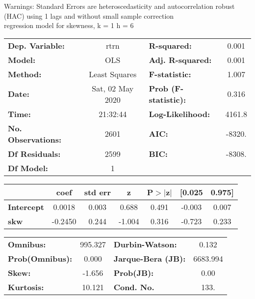 Warnings: \newline
 [1] Standard Errors are heteroscedasticity and autocorrelation robust (HAC) using 1 lags and without small sample correction\\ 

regression model for skewness, k = 1 h = 6\begin{center}
\begin{tabular}{lclc}
\toprule
\textbf{Dep. Variable:}    &       rtrn       & \textbf{  R-squared:         } &     0.001   \\
\textbf{Model:}            &       OLS        & \textbf{  Adj. R-squared:    } &     0.001   \\
\textbf{Method:}           &  Least Squares   & \textbf{  F-statistic:       } &     1.007   \\
\textbf{Date:}             & Sat, 02 May 2020 & \textbf{  Prob (F-statistic):} &    0.316    \\
\textbf{Time:}             &     21:32:44     & \textbf{  Log-Likelihood:    } &    4161.8   \\
\textbf{No. Observations:} &        2601      & \textbf{  AIC:               } &    -8320.   \\
\textbf{Df Residuals:}     &        2599      & \textbf{  BIC:               } &    -8308.   \\
\textbf{Df Model:}         &           1      & \textbf{                     } &             \\
\bottomrule
\end{tabular}
\begin{tabular}{lcccccc}
                   & \textbf{coef} & \textbf{std err} & \textbf{z} & \textbf{P$> |$z$|$} & \textbf{[0.025} & \textbf{0.975]}  \\
\midrule
\textbf{Intercept} &       0.0018  &        0.003     &     0.688  &         0.491        &       -0.003    &        0.007     \\
\textbf{skw}       &      -0.2450  &        0.244     &    -1.004  &         0.316        &       -0.723    &        0.233     \\
\bottomrule
\end{tabular}
\begin{tabular}{lclc}
\textbf{Omnibus:}       & 995.327 & \textbf{  Durbin-Watson:     } &    0.132  \\
\textbf{Prob(Omnibus):} &   0.000 & \textbf{  Jarque-Bera (JB):  } & 6683.994  \\
\textbf{Skew:}          &  -1.656 & \textbf{  Prob(JB):          } &     0.00  \\
\textbf{Kurtosis:}      &  10.121 & \textbf{  Cond. No.          } &     133.  \\
\bottomrule
\end{tabular}
\end{center}

